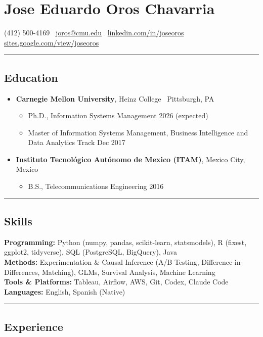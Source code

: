 \documentclass[10pt,letterpaper]{article}
\newcommand{\name}[1]{\section*{#1}}
\newcommand{\sep}{{\color{gray}\,\textbullet\,\,}}
\newcommand{\hsep}{\noindent\textcolor{gray}{\rule{\textwidth}{0.5pt}}}
\newcommand{\block}[1]{\begin{samepage}\hsep\subsection*{#1}\end{samepage}}
\begin{document}
\name{Jose Eduardo Oros Chavarria}

\begin{center}
(412) 500-4169 \sep \href{mailto:joros@cmu.edu}{joros@cmu.edu} \sep \href{https://www.linkedin.com/in/joseoros}{linkedin.com/in/joseoros} \sep \href{https://sites.google.com/view/joseoros}{sites.google.com/view/joseoros}
\end{center}

\block{Education}

\begin{itemize}[leftmargin=0pt, label={}, itemsep=4pt]
\item \textbf{Carnegie Mellon University}, Heinz College \sep Pittsburgh, PA
  \begin{itemize}[label={}]
  \item Ph.D., Information Systems Management \hfill 2026 (expected)
  \item Master of Information Systems Management, Business Intelligence and Data Analytics Track \hfill Dec 2017
  \end{itemize}
\item \textbf{Instituto Tecnol\'ogico Aut\'onomo de Mexico (ITAM)}, Mexico City, Mexico
  \begin{itemize}[label={}]
  \item B.S., Telecommunications Engineering \hfill 2016
  \end{itemize}
\end{itemize}

\block{Skills}

\noindent\textbf{Programming:} Python (numpy, pandas, scikit-learn, statsmodels), R (fixest, ggplot2, tidyverse), SQL (PostgreSQL, BigQuery), Java \\
\textbf{Methods:} Experimentation \& Causal Inference (A/B Testing, Difference-in-Differences, Matching), GLMs, Survival Analysis, Machine Learning \\
\textbf{Tools \& Platforms:} Tableau, Airflow, AWS, Git, Codex, Claude Code \\
\textbf{Languages:} English, Spanish (Native)

\block{Experience}
\end{document}
